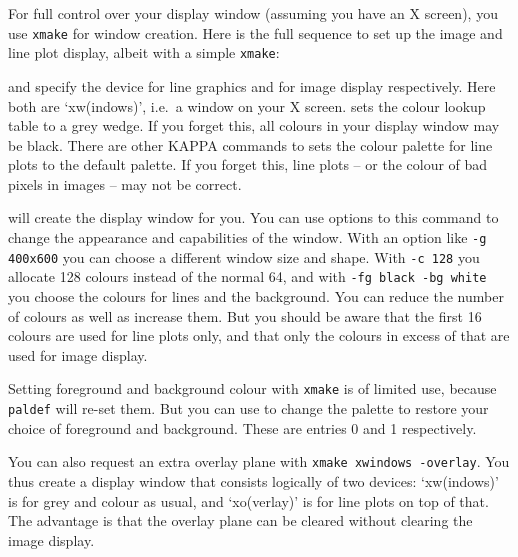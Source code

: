 \documentclass[11pt,noabs]{starlink}
\begin{document}
   For full control over your display window (assuming you have an X
   screen), you use \texttt{xmake} for window creation. Here is the full
   sequence to set up the image and line plot display, albeit with a
   simple \texttt{xmake}:

\begin{terminalv}
\end{terminalv}

\texttt{}
   and
\texttt{}
   specify the device for line graphics and for image display respectively.
   Here both are `xw(indows)', i.e.\ a window on your X screen.
\texttt{}
   sets the colour lookup table to a grey wedge. If
   you forget this, all colours in your display window may be black.
   There are other KAPPA commands to
\texttt{}
   sets the colour palette for line plots to the default palette. If
   you forget this, line plots -- or the colour of bad pixels in images --
   may not be correct.

\texttt{}
   will create the display window for you. You can use options to this
   command to change the appearance and capabilities of the window. With
   an option like \texttt{-g 400x600} you can choose a different window
   size and shape. With \texttt{-c 128} you allocate 128 colours instead
   of the normal 64, and with \texttt{-fg black -bg white} you choose
   the colours for lines and the background. You can reduce the number
   of colours as well as increase them. But you should be aware that
   the first 16 colours are used for line plots only, and that only the
   colours in excess of that are used for image display.

   Setting foreground and background colour with \texttt{xmake} is of
   limited use, because \texttt{paldef} will re-set them. But you can use
\texttt{}
   to change the palette to restore your choice of foreground and
   background. These are entries 0 and 1 respectively.

\begin{terminalv}
\end{terminalv}

   You can also request an extra overlay plane with \texttt{xmake xwindows
   -overlay}. You thus create a display window that consists
   logically of two devices: `xw(indows)' is for grey and colour as
   usual, and `xo(verlay)' is for line plots on top of that. The
   advantage is that the overlay plane can be cleared without clearing
   the image display.
\end{document}
